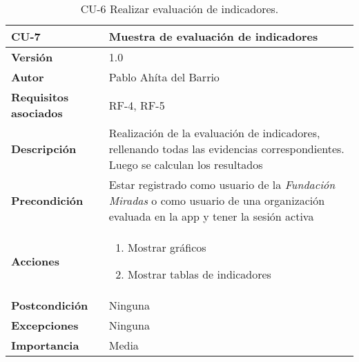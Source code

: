 \begin{table}[p]
	\centering
	\begin{tabularx}{\linewidth}{ p{} p{} }
		\toprule
		\textbf{CU-7}    & \textbf{Muestra de evaluación de indicadores}\\
		\toprule
		\textbf{Versión}              & 1.0    \\
		\textbf{Autor}                & Pablo Ahíta del Barrio \\
		\textbf{Requisitos asociados} & RF-4, RF-5  \\
		\textbf{Descripción}          & Realización de la evaluación de indicadores, rellenando todas las evidencias correspondientes. Luego se calculan los resultados \\
		\textbf{Precondición}         & Estar registrado como usuario de la \textit{Fundación Miradas} o como usuario de una organización evaluada en la app y tener la sesión activa \\
		\textbf{Acciones}             &
		\begin{enumerate}
			\def\labelenumi{\arabic{enumi}.}
			\tightlist
			\item Mostrar gráficos
			\item Mostrar tablas de indicadores
		\end{enumerate}\\
		\textbf{Postcondición}        &  Ninguna \\
		\textbf{Excepciones}          & Ninguna \\
		\textbf{Importancia}          & Media \\
		\bottomrule
	\end{tabularx}
	\caption{CU-6 Realizar evaluación de indicadores.}
\end{table}